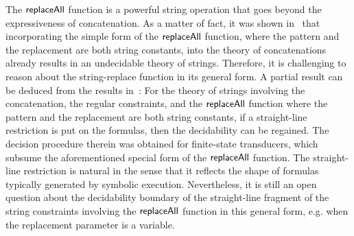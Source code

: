 


The $\mathsf{replaceAll}$ function is a powerful string operation that goes beyond the expressiveness of concatenation. As a matter of fact, it was shown in~\cite{LB16} that incorporating the simple form of the $\mathsf{replaceAll}$ function, where the pattern and the replacement are both string constants, into the theory of concatenations already results in an undecidable theory of strings.  
Therefore, it is challenging to reason about the string-replace function in its general form. 
A partial result can be deduced from the results in~\cite{LB16}: For the theory of strings involving the concatenation, the regular constraints, and the $\mathsf{replaceAll}$ function where the pattern and the replacement are both string constants, if a straight-line restriction is put on the formulas, then the decidability can be regained. The decision procedure therein was obtained for finite-state transducers, which subsume the aforementioned special form of the $\mathsf{replaceAll}$ function.  The straight-line restriction is natural in the sense that it reflects the shape of formulas typically generated by symbolic execution.
Nevertheless, it is still an open question about the decidability boundary of the straight-line fragment of the string constraints involving the $\mathsf{replaceAll}$ function in this general form, e.g. when the replacement parameter is a variable.

